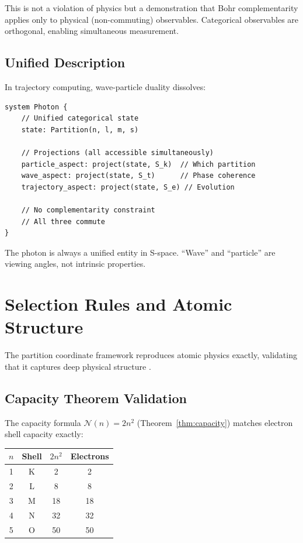 \documentclass[twocolumn,10pt]{article}
\theoremstyle{remark}
\begin{document}
This is not a violation of physics but a demonstration that Bohr complementarity applies only to physical (non-commuting) observables. Categorical observables are orthogonal, enabling simultaneous measurement.

\subsection{Unified Description}

In trajectory computing, wave-particle duality dissolves:

\begin{lstlisting}
system Photon {
    // Unified categorical state
    state: Partition(n, l, m, s)

    // Projections (all accessible simultaneously)
    particle_aspect: project(state, S_k)  // Which partition
    wave_aspect: project(state, S_t)      // Phase coherence
    trajectory_aspect: project(state, S_e) // Evolution

    // No complementarity constraint
    // All three commute
}
\end{lstlisting}

The photon is always a unified entity in S-space. ``Wave'' and ``particle'' are viewing angles, not intrinsic properties.

\section{Selection Rules and Atomic Structure}
\label{sec:selectionrules}

The partition coordinate framework reproduces atomic physics exactly, validating that it captures deep physical structure \cite{sachikonye2024derivation, sachikonye2024light}.

\subsection{Capacity Theorem Validation}

The capacity formula $\mathcal{N}(n) = 2n^2$ (Theorem~\ref{thm:capacity}) matches electron shell capacity exactly:

\begin{center}
\begin{tabular}{cccc}
\toprule
$n$ & Shell & $2n^2$ & Electrons \\
\midrule
1 & K & 2 & 2 \\
2 & L & 8 & 8 \\
3 & M & 18 & 18 \\
4 & N & 32 & 32 \\
5 & O & 50 & 50 \\
\bottomrule
\end{tabular}
\end{center}
\end{document}

